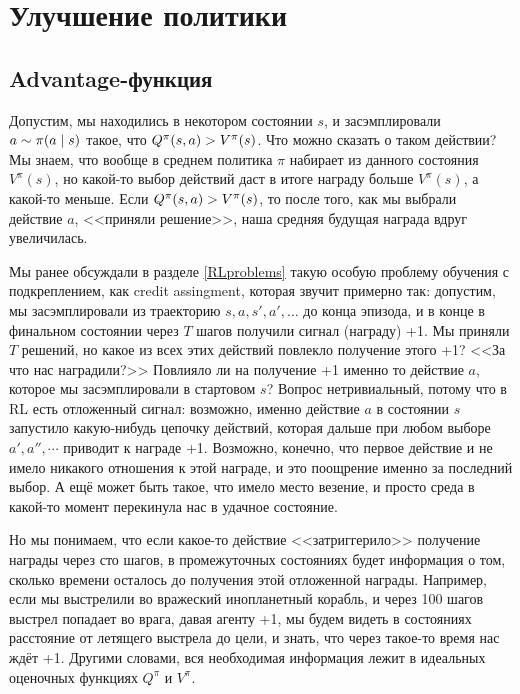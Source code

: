 \section{Улучшение политики}\label{PIsection} 

\subsection{Advantage-функция}\label{subsection:advantage}

Допустим, мы находились в некотором состоянии $s$, и засэмплировали $a \HM\sim \pi(a \HM\mid s)$ такое, что $Q^\pi(s, a) \HM> V^\pi(s)$. Что можно сказать о таком действии? Мы знаем, что вообще в среднем политика $\pi$ набирает из данного состояния $V^\pi(s)$, но какой-то выбор действий даст в итоге награду больше $V^\pi(s)$, а какой-то меньше. Если $Q^\pi(s, a) \HM> V^\pi(s)$, то после того, как мы выбрали действие $a$, <<приняли решение>>, наша средняя будущая награда вдруг увеличилась.

Мы ранее обсуждали в разделе \ref{RLproblems} такую особую проблему обучения с подкреплением, как credit assingment, которая звучит примерно так: допустим, мы засэмплировали из траекторию $s, a, s', a', \dots $ до конца эпизода, и в конце в финальном состоянии через $T$ шагов получили сигнал (награду) +1. Мы приняли $T$ решений, но какое из всех этих действий повлекло получение этого +1? <<За что нас наградили?>> Повлияло ли на получение +1 именно то действие $a$, которое мы засэмплировали в стартовом $s$? Вопрос нетривиальный, потому что в RL есть отложенный сигнал: возможно, именно действие $a$ в состоянии $s$ запустило какую-нибудь цепочку действий, которая дальше при любом выборе $a', a'', \cdots$ приводит к награде +1. Возможно, конечно, что первое действие и не имело никакого отношения к этой награде, и это поощрение именно за последний выбор. А ещё может быть такое, что имело место везение, и просто среда в какой-то момент перекинула нас в удачное состояние.

Но мы понимаем, что если какое-то действие <<затриггерило>> получение награды через сто шагов, в промежуточных состояниях будет информация о том, сколько времени осталось до получения этой отложенной награды. Например, если мы выстрелили во вражеский инопланетный корабль, и через 100 шагов выстрел попадает во врага, давая агенту +1, мы будем видеть в состояниях расстояние от летящего выстрела до цели, и знать, что через такое-то время нас ждёт +1. Другими словами, вся необходимая информация лежит в идеальных оценочных функциях $Q^\pi$ и $V^\pi$.

